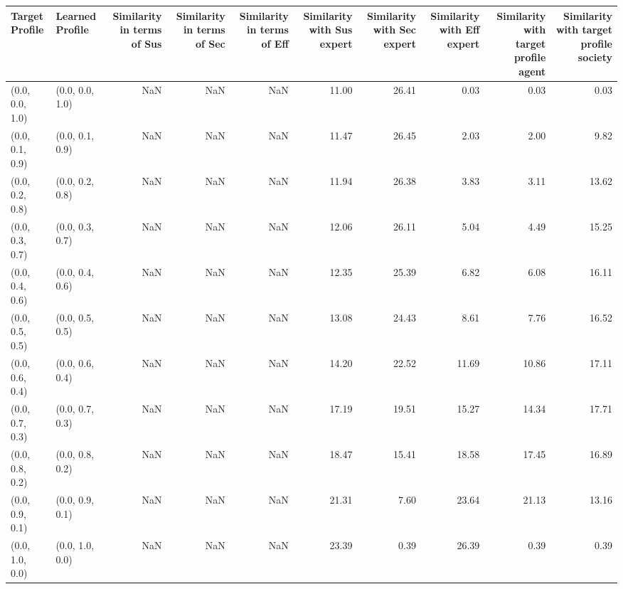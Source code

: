 \begin{tabular}{llrrrrrrrr}
\toprule
Target Profile & Learned Profile & Similarity in terms of Sus & Similarity in terms of Sec & Similarity in terms of Eff & Similarity with Sus expert & Similarity with Sec expert & Similarity with Eff expert & Similarity with target profile agent & Similarity with target profile society \\
\midrule
(0.0, 0.0, 1.0) & (0.0, 0.0, 1.0) & NaN & NaN & NaN & 11.00 & 26.41 & 0.03 & 0.03 & 0.03 \\
(0.0, 0.1, 0.9) & (0.0, 0.1, 0.9) & NaN & NaN & NaN & 11.47 & 26.45 & 2.03 & 2.00 & 9.82 \\
(0.0, 0.2, 0.8) & (0.0, 0.2, 0.8) & NaN & NaN & NaN & 11.94 & 26.38 & 3.83 & 3.11 & 13.62 \\
(0.0, 0.3, 0.7) & (0.0, 0.3, 0.7) & NaN & NaN & NaN & 12.06 & 26.11 & 5.04 & 4.49 & 15.25 \\
(0.0, 0.4, 0.6) & (0.0, 0.4, 0.6) & NaN & NaN & NaN & 12.35 & 25.39 & 6.82 & 6.08 & 16.11 \\
(0.0, 0.5, 0.5) & (0.0, 0.5, 0.5) & NaN & NaN & NaN & 13.08 & 24.43 & 8.61 & 7.76 & 16.52 \\
(0.0, 0.6, 0.4) & (0.0, 0.6, 0.4) & NaN & NaN & NaN & 14.20 & 22.52 & 11.69 & 10.86 & 17.11 \\
(0.0, 0.7, 0.3) & (0.0, 0.7, 0.3) & NaN & NaN & NaN & 17.19 & 19.51 & 15.27 & 14.34 & 17.71 \\
(0.0, 0.8, 0.2) & (0.0, 0.8, 0.2) & NaN & NaN & NaN & 18.47 & 15.41 & 18.58 & 17.45 & 16.89 \\
(0.0, 0.9, 0.1) & (0.0, 0.9, 0.1) & NaN & NaN & NaN & 21.31 & 7.60 & 23.64 & 21.13 & 13.16 \\
(0.0, 1.0, 0.0) & (0.0, 1.0, 0.0) & NaN & NaN & NaN & 23.39 & 0.39 & 26.39 & 0.39 & 0.39 \\
\bottomrule
\end{tabular}
